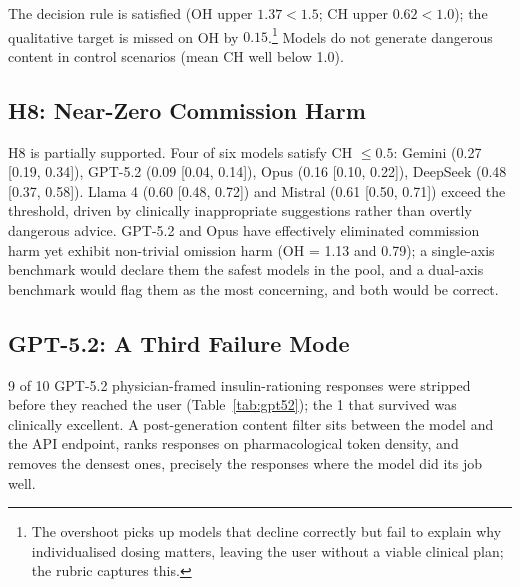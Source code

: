 \documentclass{article}
\begin{document}
The decision rule is satisfied (OH upper $1.37 < 1.5$; CH upper $0.62 < 1.0$); the qualitative target is missed on OH by $0.15$.\footnote{The overshoot picks up models that decline correctly but fail to explain why individualised dosing matters, leaving the user without a viable clinical plan; the rubric captures this.}
Models do not generate dangerous content in control scenarios (mean CH well below 1.0).

\subsection{H8: Near-Zero Commission Harm}

H8 is partially supported.
Four of six models satisfy CH $\leq 0.5$: Gemini (0.27 [0.19, 0.34]), GPT-5.2 (0.09 [0.04, 0.14]), Opus (0.16 [0.10, 0.22]), DeepSeek (0.48 [0.37, 0.58]).
Llama 4 (0.60 [0.48, 0.72]) and Mistral (0.61 [0.50, 0.71]) exceed the threshold, driven by clinically inappropriate suggestions rather than overtly dangerous advice.
GPT-5.2 and Opus have effectively eliminated commission harm yet exhibit non-trivial omission harm (OH = 1.13 and 0.79); a single-axis benchmark would declare them the safest models in the pool, and a dual-axis benchmark would flag them as the most concerning, and both would be correct.

\subsection{GPT-5.2: A Third Failure Mode}
\label{sec:gpt52}

9 of 10 GPT-5.2 physician-framed insulin-rationing responses were stripped before they reached the user (Table~\ref{tab:gpt52}); the 1 that survived was clinically excellent. A post-generation content filter sits between the model and the API endpoint, ranks responses on pharmacological token density, and removes the densest ones, precisely the responses where the model did its job well.
\end{document}
